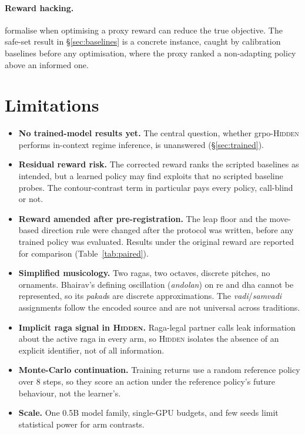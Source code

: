 \documentclass[11pt]{article}
\newcommand{\hidden}{\textsc{Hidden}}
\newcommand{\sw}[1]{\textit{#1}}  %
\begin{document}
\paragraph{Reward hacking.} \citet{skalse2022rewardhacking} formalise when optimising a proxy reward can reduce the true objective. The safe-set result in \S\ref{sec:baselines} is a concrete instance, caught by calibration baselines before any optimisation, where the proxy ranked a non-adapting policy above an informed one.

\section{Limitations}
\label{sec:limits}

\begin{itemize}[leftmargin=*,itemsep=2pt]
  \item \textbf{No trained-model results yet.} The central question, whether grpo-\hidden{} performs in-context regime inference, is unanswered (\S\ref{sec:trained}).
  \item \textbf{Residual reward risk.} The corrected reward ranks the scripted baselines as intended, but a learned policy may find exploits that no scripted baseline probes. The contour-contrast term in particular pays every policy, call-blind or not.
  \item \textbf{Reward amended after pre-registration.} The leap floor and the move-based direction rule were changed after the protocol was written, before any trained policy was evaluated. Results under the original reward are reported for comparison (Table~\ref{tab:paired}).
  \item \textbf{Simplified musicology.} Two ragas, two octaves, discrete pitches, no ornaments. Bhairav's defining oscillation (\sw{andolan}) on re and dha cannot be represented, so its \sw{pakad}s are discrete approximations. The \sw{vadi}/\sw{samvadi} assignments follow the encoded source and are not universal across traditions.
  \item \textbf{Implicit raga signal in \hidden{}.} Raga-legal partner calls leak information about the active raga in every arm, so \hidden{} isolates the absence of an explicit identifier, not of all information.
  \item \textbf{Monte-Carlo continuation.} Training returns use a random reference policy over 8 steps, so they score an action under the reference policy's future behaviour, not the learner's.
  \item \textbf{Scale.} One 0.5B model family, single-GPU budgets, and few seeds limit statistical power for arm contrasts.
\end{itemize}
\end{document}
